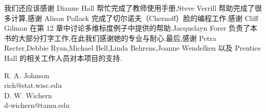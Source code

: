\noindent 我们还应该感谢 Dianne Hall 帮忙完成了教师使用手册,Steve Verrill 帮助完成了很多计算,感谢 Alison Pollack 完成了切尔诺夫（Chernoff）脸的编程工作.感谢 Cliff Gilman 在第 12 章中讨论多维标度例子中提供的帮助.Jacquelayn Forer 负责了本书的大部分打字工作,在此我们感谢她的专业与耐心.最后,感谢 Petra Recter,Debbie Ryan,Michael Bell,Linda Behrens,Joanne Wendelken 以及 Prentice Hall 的相关工作人员对本项目的支持.

\vspace{12pt}
\begin{flushright}
R. A. Johnson\\
rich@stat.wisc.edu\\
D. W. Wichern\\
d-wichern@tamu.edu
\end{flushright}


\clearpage
\tableofcontents
\clearpage


